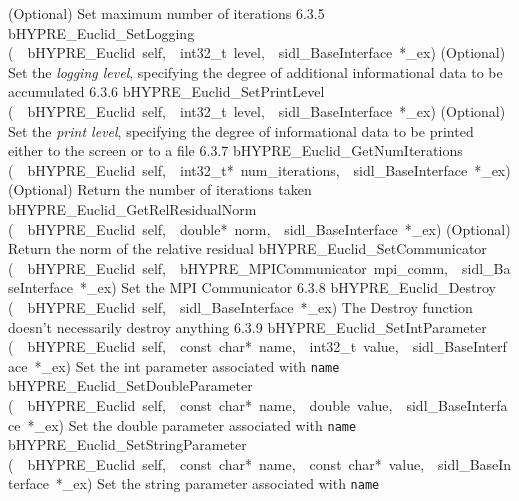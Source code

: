 \documentclass{article}
\begin{document}
\begin{cxxentry}
\begin{cxxentry}
\begin{cxxnames}
        {
(Optional) Set maximum number of iterations}
        {6.3.5}
        {bHYPRE\_Euclid\_SetLogging}
        {(\ \ bHYPRE\_Euclid\ self,\ \ int32\_t\ level,\ \ sidl\_BaseInterface\ *\_ex)}
        {
(Optional) Set the {\it logging level}, specifying the degree
of additional informational data to be accumulated}
        {6.3.6}
        {bHYPRE\_Euclid\_SetPrintLevel}
        {(\ \ bHYPRE\_Euclid\ self,\ \ int32\_t\ level,\ \ sidl\_BaseInterface\ *\_ex)}
        {
(Optional) Set the {\it print level}, specifying the degree
of informational data to be printed either to the screen or
to a file}
        {6.3.7}
        {bHYPRE\_Euclid\_GetNumIterations}
        {(\ \ bHYPRE\_Euclid\ self,\ \ int32\_t*\ num\_iterations,\ \ sidl\_BaseInterface\ *\_ex)}
        {
(Optional) Return the number of iterations taken}
        {}
\label{cxx.6.3.16}
        {bHYPRE\_Euclid\_GetRelResidualNorm}
        {(\ \ bHYPRE\_Euclid\ self,\ \ double*\ norm,\ \ sidl\_BaseInterface\ *\_ex)}
        {
(Optional) Return the norm of the relative residual}
        {}
\label{cxx.6.3.17}
        {bHYPRE\_Euclid\_SetCommunicator}
        {(\ \ bHYPRE\_Euclid\ self,\ \ bHYPRE\_MPICommunicator\ mpi\_comm,\ \ sidl\_BaseInterface\ *\_ex)}
        {
Set the MPI Communicator}
        {6.3.8}
        {bHYPRE\_Euclid\_Destroy}
        {(\ \ bHYPRE\_Euclid\ self,\ \ sidl\_BaseInterface\ *\_ex)}
        {
The Destroy function doesn't necessarily destroy anything}
        {6.3.9}
        {bHYPRE\_Euclid\_SetIntParameter}
        {(\ \ bHYPRE\_Euclid\ self,\ \ const\ char*\ name,\ \ int32\_t\ value,\ \ sidl\_BaseInterface\ *\_ex)}
        {
Set the int parameter associated with {\tt name}}
        {}
\label{cxx.6.3.18}
        {bHYPRE\_Euclid\_SetDoubleParameter}
        {(\ \ bHYPRE\_Euclid\ self,\ \ const\ char*\ name,\ \ double\ value,\ \ sidl\_BaseInterface\ *\_ex)}
        {
Set the double parameter associated with {\tt name}}
        {}
\label{cxx.6.3.19}
        {bHYPRE\_Euclid\_SetStringParameter}
        {(\ \ bHYPRE\_Euclid\ self,\ \ const\ char*\ name,\ \ const\ char*\ value,\ \ sidl\_BaseInterface\ *\_ex)}
        {
Set the string parameter associated with {\tt name}}
        {}
\label{cxx.6.3.20}

\end{cxxnames}
\end{cxxentry}
\end{cxxentry}
\end{document}
